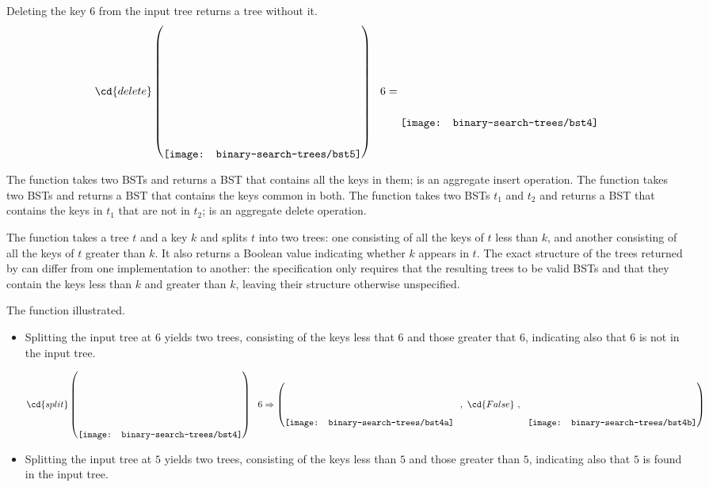 \begin{chapter}
\begin{example}
Deleting the key  $6$ from the input tree returns a tree without it.
%
\[
\cd{delete}
\left(
\raisebox{-20mm}{\texttt{[image: binary-search-trees/bst5]}}
\right) 
~~6
= 
\raisebox{-10mm}{\texttt{[image: binary-search-trees/bst4]}}
\]

\end{example}


%
The function  takes two BSTs and returns a BST that
contains all the keys in them;  is an aggregate insert
operation.
% 
The function  takes two BSTs and returns a BST
that contains the keys common in both.
% 
The function  takes two BSTs $t_1$ and $t_2$ and returns
a BST that contains the keys in $t_1$ that are not in $t_2$;
 is an aggregate delete operation.

The function  takes a tree $t$ and a key $k$ and
splits $t$ into two trees: one consisting of all the keys of $t$ less
than $k$, and another consisting of all the keys of $t$ greater than
$k$.  
%
It also returns a Boolean value indicating whether $k$ appears in $t$.
%
The exact structure of the trees returned by  can differ
from one implementation to another: the specification only requires
that the resulting trees to be valid BSTs and that they contain the
keys less than $k$ and greater than $k$, leaving their structure
otherwise unspecified.



\begin{example}

The function  illustrated.

\begin{itemize}
\item 
Splitting the input tree at $6$ yields two trees, consisting of the
keys less that $6$ and those greater that $6$, indicating also that
$6$ is not in the input tree. 

\[
\cd{split}
\left(
\raisebox{-.45in}{\texttt{[image: binary-search-trees/bst4]}}
\right)
~~6
\Rightarrow 
\left(
\raisebox{-.27in}{\texttt{[image: binary-search-trees/bst4a]}}~~,
~\cd{False}~,~~
\raisebox{-.27in}{\texttt{[image: binary-search-trees/bst4b]}}
\right) 
\]

\item 
Splitting the input tree at $5$ yields two trees, consisting of the
keys less than $5$ and those greater than $5$, indicating also that
$5$ is found in the input tree. 



\end{itemize}
\end{example}
\end{chapter}
